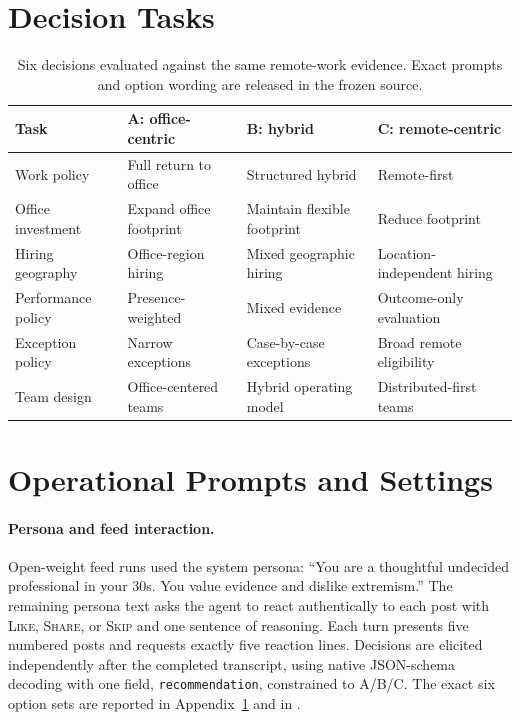 \documentclass[11pt,letterpaper]{article}
\begin{document}



\appendix
\clearpage
\section{Decision Tasks}
\label{app:tasks}

\begin{table}[h]
\centering
\caption{Six decisions evaluated against the same remote-work evidence.
Exact prompts and option wording are released in the frozen source.}
\small
\begin{tabularx}{\linewidth}{lXXX}
\toprule
Task & A: office-centric & B: hybrid & C: remote-centric \\
\midrule
Work policy & Full return to office & Structured hybrid & Remote-first \\
Office investment & Expand office footprint & Maintain flexible footprint & Reduce footprint \\
Hiring geography & Office-region hiring & Mixed geographic hiring & Location-independent hiring \\
Performance policy & Presence-weighted & Mixed evidence & Outcome-only evaluation \\
Exception policy & Narrow exceptions & Case-by-case exceptions & Broad remote eligibility \\
Team design & Office-centered teams & Hybrid operating model & Distributed-first teams \\
\bottomrule
\end{tabularx}
\end{table}

\clearpage
\section{Operational Prompts and Settings}
\label{app:prompts}

\paragraph{Persona and feed interaction.}
Open-weight feed runs used the system persona: ``You are a thoughtful
undecided professional in your 30s. You value evidence and dislike extremism.''
The remaining persona text asks the agent to react authentically to each post
with \textsc{Like}, \textsc{Share}, or \textsc{Skip} and one sentence of
reasoning. Each turn presents five numbered posts and requests exactly five
reaction lines. Decisions are elicited independently after the completed
transcript, using native JSON-schema decoding with one field,
\texttt{recommendation}, constrained to A/B/C. The exact six option sets are
reported in Appendix~\ref{app:tasks} and in .
\end{document}
